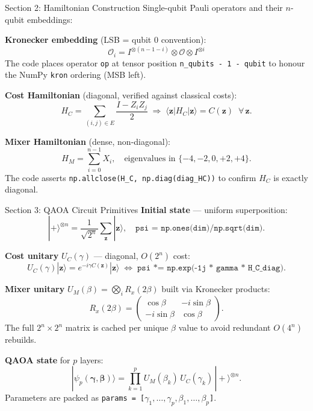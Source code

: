 \documentclass{beamer}
\begin{document}

\begin{frame}[fragile]{Section 2: Hamiltonian Construction}
Single-qubit Pauli operators and their $n$-qubit embeddings:

\medskip

\textbf{Kronecker embedding} (LSB = qubit 0 convention):
\[
  \mathcal{O}_i = I^{\otimes (n-1-i)} \otimes \mathcal{O} \otimes I^{\otimes i}
\]
The code places operator \texttt{op} at tensor position \texttt{n\_qubits - 1 - qubit}
to honour the NumPy \texttt{kron} ordering (MSB left).

\medskip

\textbf{Cost Hamiltonian} (diagonal, verified against classical costs):
\[
  H_C = \sum_{(i,j)\in E} \frac{I - Z_i Z_j}{2}
  \;\Longrightarrow\;
  \langle \mathbf{z} | H_C | \mathbf{z}\rangle = C(\mathbf{z}) \;\;\forall\,\mathbf{z}.
\]

\textbf{Mixer Hamiltonian} (dense, non-diagonal):
\[
  H_M = \sum_{i=0}^{n-1} X_i,
  \quad \text{eigenvalues in } \{-4,-2,0,+2,+4\}.
\]
The code asserts \texttt{np.allclose(H\_C, np.diag(diag\_HC))} to confirm
$H_C$ is exactly diagonal.
\end{frame}


\begin{frame}[fragile]{Section 3: QAOA Circuit Primitives}
\textbf{Initial state} — uniform superposition:
\[
  |{+}\rangle^{\otimes n} = \frac{1}{\sqrt{2^n}}\sum_{\mathbf{z}}|\mathbf{z}\rangle,
  \quad \texttt{psi = np.ones(dim)/np.sqrt(dim)}.
\]

\textbf{Cost unitary} $U_C(\gamma)$ — diagonal, $O(2^n)$ cost:
\[
  U_C(\gamma)|\mathbf{z}\rangle = e^{-i\gamma C(\mathbf{z})}|\mathbf{z}\rangle
  \;\Longleftrightarrow\;
  \texttt{psi *= np.exp(-1j * gamma * H\_C\_diag)}.
\]

\textbf{Mixer unitary} $U_M(\beta) = \bigotimes_i R_x(2\beta)$ built via Kronecker products:
\[
  R_x(2\beta) = \begin{pmatrix}\cos\beta & -i\sin\beta \\ -i\sin\beta & \cos\beta\end{pmatrix}.
\]
The full $2^n \times 2^n$ matrix is cached per unique $\beta$ value to avoid
redundant $O(4^n)$ rebuilds.

\medskip

\textbf{QAOA state} for $p$ layers:
\[
  |\psi_p(\boldsymbol{\gamma},\boldsymbol{\beta})\rangle
  = \prod_{k=1}^{p} U_M(\beta_k)\,U_C(\gamma_k)\,|{+}\rangle^{\otimes n}.
\]
Parameters are packed as \texttt{params = [}$\gamma_1,\ldots,\gamma_p,\beta_1,\ldots,\beta_p$\texttt{]}.
\end{frame}
\end{document}
